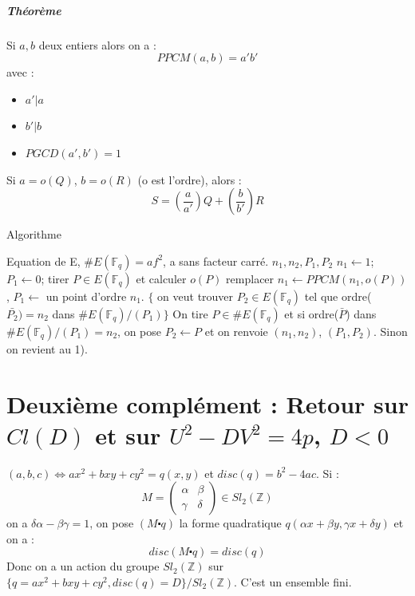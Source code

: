 \documentclass[12pt,a4paper]{report}
\begin{document}
\paragraph{Théorème\\}
Si $a,b$ deux entiers alors on a :
$$ PPCM(a,b) = a'b' $$
avec :
\begin{itemize}
\item $a'|a$
\item $b'|b$
\item $PGCD(a',b')=1$
\end{itemize}
Si $a=o(Q)$, $b=o(R)$ (o est l'ordre), alors :
$$ S= \left(\frac{a}{a'}\right)Q + \left(\frac{b}{b'}\right)R $$

 \begin{algorithm}[ht]
\caption{Algorithme}
\begin{algorithmic}[1]
\REQUIRE Equation de E, $\# E(\mathbb{F}_q) = af^2$, a sans facteur carré.
\ENSURE $n_1,n_2,P_1,P_2$
\STATE $n_1 \leftarrow 1$; $P_1 \leftarrow 0$;
\REPEAT 
\STATE tirer $P \in E(\mathbb{F}_q)$ et calculer $o(P)$
\STATE remplacer $n_1 \leftarrow PPCM(n_1,o(P))$, $P_1 \leftarrow$ un point d'ordre $n_1$.
\STATE $\{$ on veut trouver $P_2 \in E(\mathbb{F}_q)$ tel que ordre($\bar{P_2})=n_2$ dans $\# E(\mathbb{F}_q)/(P_1)\}$
\STATE On tire $P \in \# E(\mathbb{F}_q)$ et si ordre($\bar{P}$) dans $\# E(\mathbb{F}_q)/(P_1)= n_2$, on pose $P_2\leftarrow P$ et on renvoie $(n_1,n_2)$, $(P_1,P_2)$. Sinon on revient au 1).
\end{algorithmic}
\end{algorithm}
\chapter{Deuxième complément : Retour sur $Cl(D)$ et sur $U^2 - DV^2 = 4p$, $D<0$}
$(a,b,c) \Leftrightarrow ax^2+bxy+cy^2 = q(x,y)$ et $disc(q) = b^2-4ac$.
Si :
$$ M = \left(\begin{array}{cc}
 \alpha & \beta \\
 \gamma & \delta \end{array} \right) \in Sl_2(\mathbb{Z})$$
 on a $\delta\alpha - \beta\gamma = 1$, on pose $(M\centerdot q)$ la forme quadratique $q(\alpha x+\beta y,\gamma x+\delta y)$ et on a :
 $$ disc(M\centerdot q) = disc(q) $$
 Donc on a un action du groupe $Sl_2(\mathbb{Z})$ sur $\{q=ax^2+bxy+cy^2, disc(q) = D\}/Sl_2(\mathbb{Z})$. C'est un ensemble fini.

 
\end{document}
